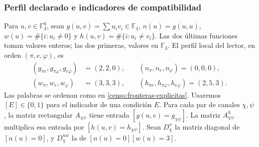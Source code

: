 \subsubsection{Perfil declarado e indicadores de compatibilidad}

Para \(u,v\in\mathbb F_3^6\), sean
\(g(u,v)=\sum u_iv_i\in\mathbb F_3\),
\(n(u)=g(u,u)\), \(w(u)=\#\{i:u_i\ne0\}\) y
\(h(u,v)=\#\{i:u_i\ne v_i\}\). Las dos últimas funciones toman
valores enteros; las dos primeras, valores en \(\mathbb F_3\).
El perfil local del lector, en orden \((\pi,e,\varphi)\), es
\begin{equation}
 \begin{split}
 (g_{\pi e},g_{\pi\varphi},g_{e\varphi})&=(2,2,0),\qquad
 (n_\pi,n_e,n_\varphi)=(0,0,0),\\
 (w_\pi,w_e,w_\varphi)&=(3,3,3),\qquad
 (h_{\pi e},h_{\pi\varphi},h_{e\varphi})=(2,5,3).
 \end{split}
 \label{censo:perfil-local}
\end{equation}
Las palabras se ordenan como en \eqref{censo:fronteras-explicitas}.
Usaremos \([E]\in\{0,1\}\) para el indicador de una condición \(E\).
Para cada par de canales \(\chi,\psi\), la matriz rectangular
\(A_{\chi\psi}\) tiene entrada \([g(u,v)=g_{\chi\psi}]\).
La matriz \(A^{h}_{\chi\psi}\) multiplica esa entrada por
\([h(u,v)=h_{\chi\psi}]\). Sean \(D_\chi^n\) la matriz diagonal
de \([n(u)=0]\), y \(D_\chi^{nw}\) la de
\([n(u)=0][w(u)=3]\).

